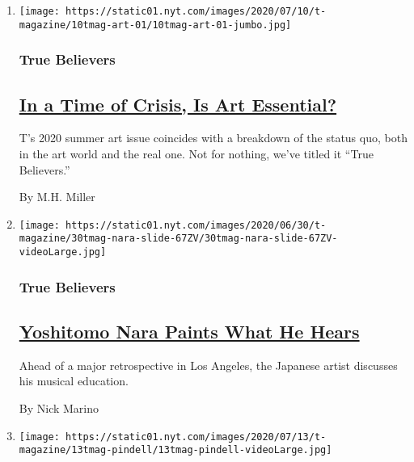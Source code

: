 \begin{enumerate}
\def\labelenumi{\arabic{enumi}.}
\item
  \texttt{[image: https://static01.nyt.com/images/2020/07/10/t-magazine/10tmag-art-01/10tmag-art-01-jumbo.jpg]}

  \hypertarget{true-believers}{%
  \subsubsection{True Believers}\label{true-believers}}

  \hypertarget{in-a-time-of-crisis-is-art-essential}{%
  \subsection{\texorpdfstring{\href{/2020/07/20/t-magazine/museums-galleries-open-art.html}{In
  a Time of Crisis, Is Art
  Essential?}}{In a Time of Crisis, Is Art Essential?}}\label{in-a-time-of-crisis-is-art-essential}}

  T's 2020 summer art issue coincides with a breakdown of the status
  quo, both in the art world and the real one. Not for nothing, we've
  titled it ``True Believers.''

  By M.H. Miller
\item
  \texttt{[image: https://static01.nyt.com/images/2020/06/30/t-magazine/30tmag-nara-slide-67ZV/30tmag-nara-slide-67ZV-videoLarge.jpg]}

  \hypertarget{true-believers-1}{%
  \subsubsection{True Believers}\label{true-believers-1}}

  \hypertarget{yoshitomo-nara-paints-what-he-hears}{%
  \subsection{\texorpdfstring{\href{/2020/07/24/t-magazine/yoshitomo-nara.html}{Yoshitomo
  Nara Paints What He
  Hears}}{Yoshitomo Nara Paints What He Hears}}\label{yoshitomo-nara-paints-what-he-hears}}

  Ahead of a major retrospective in Los Angeles, the Japanese artist
  discusses his musical education.

  By Nick Marino
\item
  \texttt{[image: https://static01.nyt.com/images/2020/07/13/t-magazine/13tmag-pindell/13tmag-pindell-videoLarge.jpg]}


\end{enumerate}
